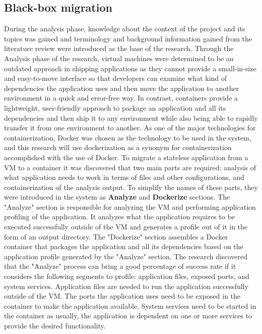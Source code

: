 \documentclass{article}
\begin{document}
\begin{multicols}{2}
\subsection{Black-box migration}
During the analysis phase, knowledge about the context of the project and its topics was gained and terminology and background information gained from the literature review were introduced as the base of the research. Through the Analysis phase of the research, virtual machines were determined to be an outdated approach in shipping applications as they cannot provide a small-in-size and easy-to-move interface so that developers can examine what kind of dependencies the application uses and then move the application to another environment in a quick and error-free way. In contrast, containers provide a lightweight, user-friendly approach to package an application and all its dependencies and then ship it to any environment while also being able to rapidly transfer it from one environment to another. As one of the major technologies for containerization, Docker was chosen as the technology to be used in the system, and this research will use dockerization as a synonym for containerization accomplished with the use of Docker. To migrate a stateless application from a VM to a container it was discovered that two main parts are required: analysis of what application needs to work in terms of files and other configurations, and containerization of the analysis output. To simplify the names of these parts, they were introduced in the system as \textbf{Analyze} and \textbf{Dockerize} sections. The "Analyze" section is responsible for analyzing the VM and performing application profiling of the application. It analyzes what the application requires to be executed successfully outside of the VM and generates a profile out of it in the form of an output directory. The "Dockerize" section assembles a Docker container that packages the application and all its dependencies based on the application profile generated by the "Analyze" section. The research discovered that the "Analyze" process can bring a good percentage of success rate if it considers the following segments to profile: application files, exposed ports, and system services. Application files are needed to run the application successfully outside of the VM. The ports the application uses need to be exposed in the container to make the application available. System services need to be started in the container as usually, the application is dependent on one or more services to provide the desired functionality.

\end{multicols}
\end{document}
